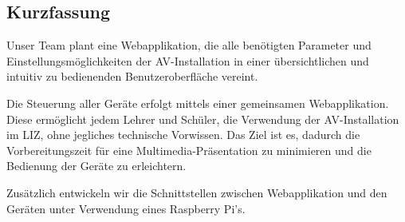 \hypertarget{kurzfassung}{%
\subsection{Kurzfassung}\label{kurzfassung}}

Unser Team plant eine Webapplikation, die alle benötigten Parameter und
Einstellungsmöglichkeiten der AV-Installation in einer übersichtlichen
und intuitiv zu bedienenden Benutzeroberfläche vereint.

Die Steuerung aller Geräte erfolgt mittels einer gemeinsamen
Webapplikation. Diese ermöglicht jedem Lehrer und Schüler, die
Verwendung der AV-Installation im LIZ, ohne jegliches technische
Vorwissen. Das Ziel ist es, dadurch die Vorbereitungszeit für eine
Multimedia-Präsentation zu minimieren und die Bedienung der Geräte zu
erleichtern.

Zusätzlich entwickeln wir die Schnittstellen zwischen Webapplikation und
den Geräten unter Verwendung eines Raspberry Pi's.
